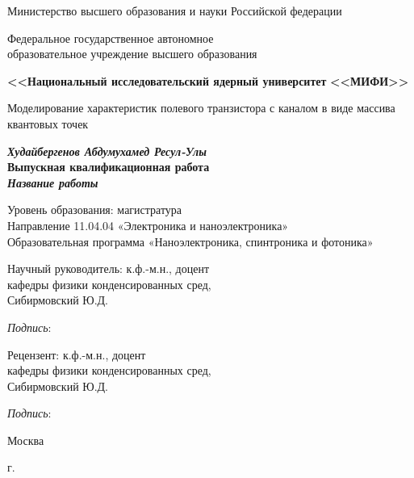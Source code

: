 \begin{titlepage}
\begin{center}
Министерство высшего образования и науки Российской федерации

Федеральное государственное автономное \\образовательное учреждение высшего образования

\textbf{<<Национальный исследовательский ядерный университет}
\textbf{<<МИФИ>>}

\vspace{25mm}Моделирование характеристик полевого транзистора
с каналом в виде массива квантовых точек

\textbf{\textit{\large Худайбергенов Абдумухамед Ресул-Улы}} \\[8mm]
\textbf{\large Выпускная квалификационная работа}\\[3mm]
\textbf{\textit{\large Название работы}}

\vspace{15mm}
Уровень образования: магистратура\\
Направление 11.04.04 «Электроника и наноэлектроника»\\
Образовательная программа
«Наноэлектроника, спинтроника и фотоника»

\vspace{10mm}

\begin{flushright}
\begin{minipage}[t]{0.7\textwidth}
{Научный руководитель:} к.ф.-м.н., доцент\\
кафедры физики конденсированных сред, \\Сибирмовский Ю.Д. 

\vspace{5mm}

\textit{Подпись}: \hrulefill

\vspace{10mm}

{Рецензент:} к.ф.-м.н., доцент\\
кафедры физики конденсированных сред, \\Сибирмовский Ю.Д. 

\vspace{5mm}

\textit{Подпись}: \hrulefill

\end{minipage}
\end{flushright}

\vfill 

{Москва}
\par{\the\year{} г.}
\end{center}
\end{titlepage}
\restoregeometry
\addtocounter{page}{1}
